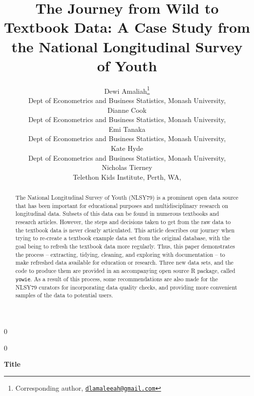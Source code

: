 \documentclass[12pt]{article}
\newcommand{\blind}{0}
\def\spacingset#1{\renewcommand{\baselinestretch}%
{#1}\small\normalsize} \spacingset{1}
\begin{document}
%

\def\spacingset#1{\renewcommand{\baselinestretch}%
{#1}\small\normalsize} \spacingset{1}



\blind
{
  \title{\bf The Journey from Wild to Textbook Data: A Case Study from the National Longitudinal Survey of Youth}
  \author{
            Dewi Amaliah\thanks{Corresponding author, \href{mailto:dlamaleeah@gmail.com}{\nolinkurl{dlamaleeah@gmail.com}}}\\
      Dept of Econometrics and Business Statistics, Monash University, \\
            Dianne Cook\\
      Dept of Econometrics and Business Statistics, Monash University, \\
            Emi Tanaka\\
      Dept of Econometrics and Business Statistics, Monash University, \\
            Kate Hyde\\
      Dept of Econometrics and Business Statistics, Monash University, \\
            Nicholas Tierney\\
      Telethon Kids Institute, Perth, WA, }
        \maketitle
} \fi

\blind
{
  \bigskip
  \bigskip
  \bigskip
  \begin{center}
    {\LARGE\bf Title}
\end{center}
  \medskip
} \fi

\bigskip
\begin{abstract}
The National Longitudinal Survey of Youth (NLSY79) is a prominent open data source that has been important for educational purposes and multidisciplinary research on longitudinal data. Subsets of this data can be found in numerous textbooks and research articles. However, the steps and decisions taken to get from the raw data to the textbook data is never clearly articulated. This article describes our journey when trying to re-create a textbook example data set from the original database, with the goal being to refresh the textbook data more regularly. Thus, this paper demonstrates the process -- extracting, tidying, cleaning, and exploring with documentation -- to make refreshed data available for education or research. Three new data sets, and the code to produce them are provided in an accompanying open source R package, called \texttt{yowie}. As a result of this process, some recommendations are also made for the NLSY79 curators for incorporating data quality checks, and providing more convenient samples of the data to potential users.
\end{abstract}
\end{document}
